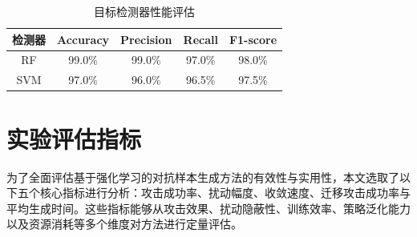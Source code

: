 
\begin{table}[htbp]
	\centering
	\caption{目标检测器性能评估}
	\label{tab:5.4}
	\renewcommand{\arraystretch}{1.3}
	\begin{tabular*}{0.9\textwidth}{@{\extracolsep{\fill}}ccccc}
		\toprule
		检测器 & Accuracy & Precision & Recall & F1-score \\
		\midrule
		RF  & 99.0\% & 99.0\% & 97.0\% & 98.0\% \\
		SVM & 97.0\% & 96.0\% & 96.5\% & 97.5\% \\
		\bottomrule
	\end{tabular*}
\end{table}


\section{实验评估指标}

为了全面评估基于强化学习的对抗样本生成方法的有效性与实用性，本文选取了以下五个核心指标进行分析：攻击成功率、扰动幅度、收敛速度、迁移攻击成功率与平均生成时间。这些指标能够从攻击效果、扰动隐蔽性、训练效率、策略泛化能力以及资源消耗等多个维度对方法进行定量评估。

